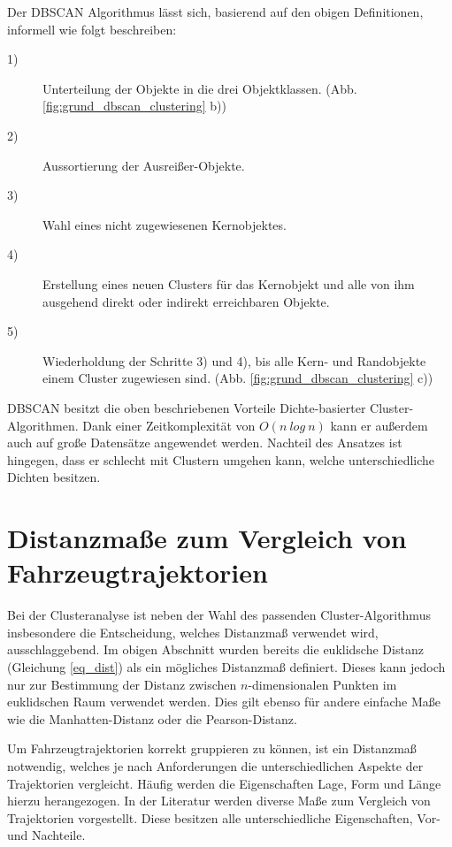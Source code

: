 Der DBSCAN Algorithmus lässt sich, basierend auf den obigen Definitionen, informell wie folgt beschreiben:

\begin{description}
    \item[1)] Unterteilung der Objekte in die drei Objektklassen. (Abb. \ref{fig:grund_dbscan_clustering} b))
    \item[2)] Aussortierung der Ausreißer-Objekte.
    \item[3)] Wahl eines nicht zugewiesenen Kernobjektes.
    \item[4)] Erstellung eines neuen Clusters für das Kernobjekt und alle von ihm ausgehend direkt oder indirekt erreichbaren Objekte.
    \item[5)] Wiederholdung der Schritte 3) und 4), bis alle Kern- und Randobjekte einem Cluster zugewiesen sind. (Abb. \ref{fig:grund_dbscan_clustering} c))
\end{description}

DBSCAN besitzt die oben beschriebenen Vorteile Dichte-basierter Cluster-Algorithmen. Dank einer Zeitkomplexität
von $O(n\ log\ n)$ kann er außerdem auch auf große Datensätze angewendet werden.
Nachteil des Ansatzes ist hingegen, dass er schlecht mit Clustern umgehen kann, welche unterschiedliche Dichten besitzen.

\section{Distanzmaße zum Vergleich von Fahrzeugtrajektorien}
\label{sec:distance_measures}

Bei der Clusteranalyse ist neben der Wahl des passenden Cluster-Algorithmus insbesondere
die Entscheidung, welches Distanzmaß verwendet wird, ausschlaggebend.
Im obigen Abschnitt wurden bereits die euklidsche Distanz (Gleichung \ref{eq_dist}) als ein mögliches Distanzmaß
definiert. Dieses kann jedoch nur zur Bestimmung der Distanz zwischen $n$-dimensionalen Punkten im euklidschen Raum verwendet
werden. Dies gilt ebenso für andere einfache Maße wie die Manhatten-Distanz oder die Pearson-Distanz.

Um Fahrzeugtrajektorien korrekt gruppieren zu können, ist ein Distanzmaß notwendig, welches je nach Anforderungen
die unterschiedlichen Aspekte der Trajektorien vergleicht. Häufig werden die Eigenschaften Lage, Form und Länge
hierzu herangezogen. In der Literatur werden diverse Maße zum Vergleich von Trajektorien vorgestellt. Diese besitzen
alle unterschiedliche Eigenschaften, Vor- und Nachteile.


